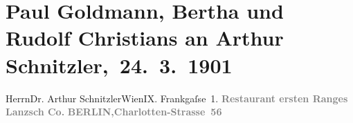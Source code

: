 

         
         \renewcommand{\erwaehntePersonen}{Personen: Rudolf Christians, Paul Goldmann, Bertha Klein}
         \renewcommand{\erwaehnteInstitutionen}{Institutionen: Volkstheater}
         \renewcommand{\erwaehnteOrte}{Orte: Berlin, Charlottenstraße, Frankgasse 1, Lanzsch {\kaufmannsund}  Co., Schauspielhaus, Wien}
         \renewcommand{\erwaehnteWerke}{Werke: Abschiedssouper, Anatol, Der Schleier der Beatrice. Schauspiel in fünf Akten, Weihnachts-Einkäufe}
               \section[Paul Goldmann, Bertha und Rudolf Christians an Arthur Schnitzler, 24. 3. 1901]{ Paul Goldmann, Bertha und Rudolf Christians an Arthur
               Schnitzler, 24. 3. 1901}\nopagebreak{}\rehead{ }\begin{ledgroupsized}[t]{13cm}\normalsize\beginnumbering \toendnotes[C]{\smallbreak\pagebreak[2]} 
\toendnotes[C]{\smallbreak}\pstart{}{\pb}Herrn\pend{}\pstart{}Dr. Arthur Schnitzler\pend{}\pstart{}Wien\pend{}\pstart{}IX. Frankgaſse 1.\pend{}{\bigskip}\pstart
           \noindent{}\centering{}{\pb}\textcolor{gray}{\textbf{\textbf{Restaurant ersten Ranges Lanzsch
                           {\kaufmannsund} Co.}}}\pend
           \pstart
           \noindent{}\centering{}\textcolor{gray}{\textbf{\textbf{BERLIN,}Charlotten-Strasse 56}}\pend

\end{ledgroupsized}

